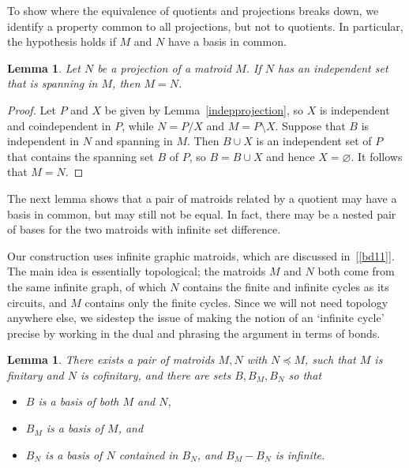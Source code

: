 \documentclass{amsart}
\theoremstyle{plain}
\newtheorem{lemma}[theorem]{Lemma}
\theoremstyle{definition}
\newcommand{\del}{\!\setminus\!}
\newcommand{\con}{/}
\newcommand{\es}{\varnothing}
\begin{document}
To show where the equivalence of quotients and projections breaks down, 
we identify a property common to all projections, but not to quotients. 
In particular, the hypothesis holds if $M$ and $N$ have a basis in common. 

\begin{lemma}\label{commonbasis}
  Let $N$ be a projection of a matroid $M$. If $N$ has an independent set that is spanning in $M$, then $M = N$. 
\end{lemma}
\begin{proof}
  Let $P$ and $X$ be given by Lemma~\ref{indepprojection}, so $X$ is independent and coindependent in $P$, 
  while $N = P \con X$ and $M = P \del X$. 
  Suppose that $B$ is independent in $N$ and spanning in $M$.
  Then $B \cup X$ is an independent set of $P$ that contains the spanning set $B$ of $P$, 
  so $B = B \cup X$ and hence $X = \es$. It follows that $M = N$. 
\end{proof}

The next lemma shows that a pair of matroids related by a quotient may have a basis in common,
but may still not be equal. In fact, there may be a nested pair of bases for the two matroids 
with infinite set difference. 

Our construction uses infinite graphic matroids, which are discussed in~[\ref{bd11}]. 
The main idea is essentially topological; the matroids $M$ and $N$ both come from the same 
infinite graph, of which $N$ contains the finite and infinite cycles as its circuits, 
and $M$ contains only the finite cycles. 
Since we will not need topology anywhere else, 
we sidestep the issue of making the notion of an `infinite cycle' precise by 
working in the dual and phrasing the argument in terms of bonds. 

\begin{lemma}\label{badgraphic}
  There exists a pair of matroids $M,N$ with $N \preceq M$, such that $M$ is finitary and $N$ is cofinitary, 
  and there are sets $B, B_M, B_N$ so that
  \begin{itemize}
    \item $B$ is a basis of both $M$ and $N$,
    \item $B_M$ is a basis of $M$, and 
    \item $B_N$ is a basis of $N$ contained in $B_N$, and $B_M - B_N$ is infinite. 
  \end{itemize}
\end{lemma}
\end{document}
